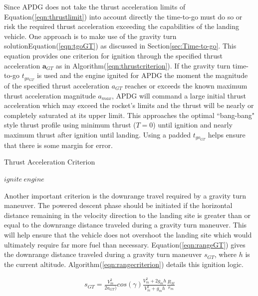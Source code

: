 Since APDG does not take the thrust acceleration limits of Equation\:(\ref{eqn:thrustlimit}) into account directly the time-to-go must do so or risk the required thrust acceleration exceeding the capabilities of the landing vehicle. One approach is to make use of the gravity turn solution\:Equation\:(\ref{eqn:tgoGT}) as discussed in Section\:\ref{sec:Time-to-go}. This equation provides one criterion for ignition through the specified thrust acceleration $\bm{a}_{GT}$ as in Algorithm\:(\ref{eqn:thrustcriterion}). If the gravity turn time-to-go $t_{go_{GT}}$ is used and the engine ignited for APDG the moment the magnitude of the specified thrust acceleration $a_{GT}$ reaches or exceeds the known maximum thrust acceleration magnitude $a_{max}$, APDG will command a large initial thrust acceleration which may exceed the rocket's limits and the thrust will be nearly or completely saturated at its upper limit. This approaches the optimal ``bang-bang" style thrust profile using minimum thrust ($T = 0$) until ignition and nearly maximum thrust after ignition until landing. Using a padded $t_{go_{GT}}$ helps ensure that there is some margin for error.




\begin{algorithm}[H]
	\caption{Thrust Acceleration Criterion}\label{eqn:thrustcriterion}
	\begin{algorithmic}[1]
			\State $ ignite\: engine $
		\EndIf
	\end{algorithmic}
\end{algorithm}




Another important criterion is the downrange travel required by a gravity turn maneuver. The powered descent phase should be initiated if the horizontal distance remaining in the velocity direction to the landing site is greater than or equal to the downrange distance traveled during a gravity turn maneuver. This will help ensure that the vehicle does not overshoot the landing site which would ultimately require far more fuel than necessary. Equation\:(\ref{eqn:rangeGT}) gives the downrange distance traveled during a gravity turn maneuver $s_{GT}$, where $h$ is the current altitude. Algorithm\:(\ref{eqn:rangecriterion}) details this ignition logic.

\begin{equation}
\label{eqn:rangeGT}
\begin{split}
s_{GT} = \frac{V_m^2}{2a_{GT})}cos(\gamma)\frac{V_m^2+2g_mh}{V_m^2+g_mh}\frac{R_M}{r_m}
\end{split}
\end{equation}

